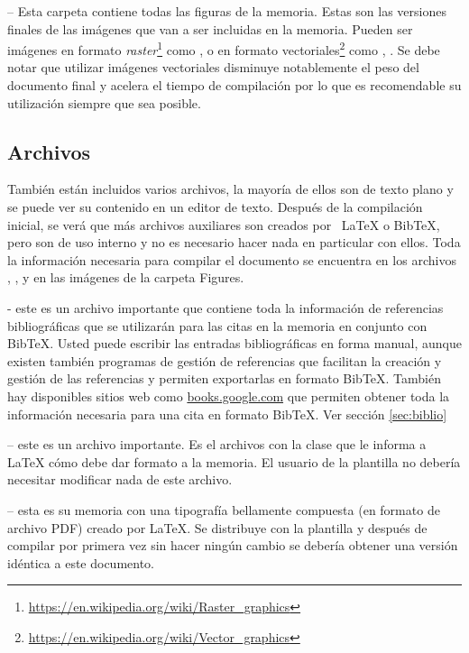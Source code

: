  -- Esta carpeta contiene todas las figuras de la memoria.  Estas son las versiones finales de las imágenes que van a ser incluidas en la memoria.  Pueden ser imágenes en formato \textit{raster}\footnote{\url{https://en.wikipedia.org/wiki/Raster_graphics}} como ,  o en formato vectoriales\footnote{\url{https://en.wikipedia.org/wiki/Vector_graphics}} como , .  Se debe notar que utilizar imágenes vectoriales disminuye notablemente el peso del documento final y acelera el tiempo de compilación por lo que es recomendable su utilización siempre que sea posible.

\subsection{Archivos}

También están incluidos varios archivos, la mayoría de ellos son de texto plano y se puede ver su contenido en un editor de texto. Después de la compilación inicial, se verá que más archivos auxiliares son creados por \ LaTeX{} o BibTeX, pero son de uso interno y no es necesario hacer nada en particular con ellos.  Toda la información necesaria para compilar el documento se encuentra en los archivos , ,  y en las imágenes de la carpeta Figures.

 - este es un archivo importante que contiene toda la información de referencias bibliográficas que se utilizarán para las citas en la memoria en conjunto con BibTeX. Usted puede escribir las entradas bibliográficas en forma manual, aunque existen también programas de gestión de referencias que facilitan la creación y gestión de las referencias y permiten exportarlas en formato BibTeX.  También hay disponibles sitios web como \url{books.google.com} que permiten obtener toda la información necesaria para una cita en formato BibTeX. Ver sección \ref{sec:biblio}

 -- este es un archivo importante. Es el archivos con la clase que le informa a \LaTeX{} cómo debe dar formato a la memoria. El usuario de la plantilla no debería necesitar modificar nada de este archivo.

 -- esta es su memoria con una tipografía bellamente compuesta (en formato de archivo PDF) creado por \LaTeX{}. Se distribuye con la plantilla y después de compilar por primera vez sin hacer ningún cambio se debería obtener una versión idéntica a este documento.

